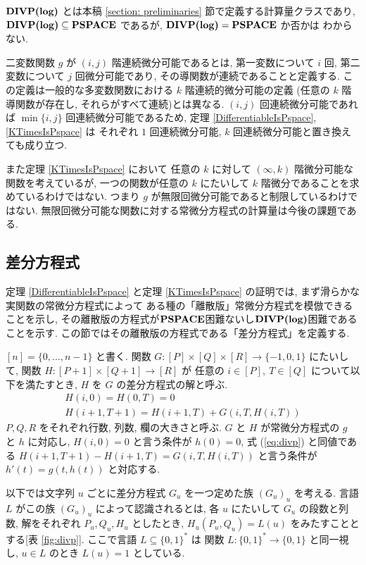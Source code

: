  $\text{\bf DIVP(log)}$ とは本稿 \ref{section: preliminaries} 節で定義する計算量クラスであり,
 $\text{\bf DIVP(log)} \subseteq {\bf PSPACE}$ であるが, $\text{\bf DIVP(log)} = {\bf PSPACE}$ か否かは
 わからない. 

 二変数関数 $g$ が $(i, j)$ 階連続微分可能であるとは,
 第一変数について $i$ 回, 第二変数について $j$ 回微分可能であり,
 その導関数が連続であることと定義する.
 この定義は一般的な多変数関数における $k$ 階連続的微分可能の定義
 (任意の $k$ 階導関数が存在し, それらがすべて連続)とは異なる.
 $(i,j)$ 回連続微分可能であれば $\min \{i, j\}$ 回連続微分可能であるため,
 定理 \ref{DifferentiableIsPspace}, \ref{KTimesIsPspace} は
 それぞれ $1$ 回連続微分可能, $k$ 回連続微分可能と置き換えても成り立つ.

 また定理 \ref{KTimesIsPspace} において
 任意の $k$ に対して $(\infty, k)$ 階微分可能な関数を考えているが,
 一つの関数が任意の $k$ にたいして $k$ 階微分であることを求めているわけではない.
 つまり $g$ が無限回微分可能であると制限しているわけではない. 
 無限回微分可能な関数に対する常微分方程式の計算量は今後の課題である.





\subsection{差分方程式}
\label{section:divp}

定理 \ref{DifferentiableIsPspace} と定理 \ref{KTimesIsPspace} の証明では,
まず滑らかな実関数の常微分方程式によって
ある種の「離散版」常微分方程式を模倣できることを示し, 
その離散版の方程式が${\bf PSPACE}$困難ないし$\text{\bf DIVP(log)}$困難であることを示す.
この節ではその離散版の方程式である「差分方程式」を定義する.

$[n] = \{0, \dots , n-1\}$ と書く.
関数 $G \colon [P] \times [Q] \times [R] \to \{-1, 0, 1\}$ にたいして,
関数 $H \colon [P + 1] \times [Q+1] \to [R]$ が
任意の $i \in [P],\ T \in [Q]$ について以下を満たすとき,
$H$ を $G$ の差分方程式の解と呼ぶ.
\begin{gather}
   H(i, 0) = H(0, T) = 0 
\\
   H(i + 1, T + 1) = H(i+1, T) + G(i, T, H(i, T))  \label{eq:divp}
\end{gather}
$P, Q, R$ をそれぞれ行数, 列数, 欄の大きさと呼ぶ.
$G$ と $H$ が常微分方程式の $g$ と $h$ に対応し,
$H(i, 0) = 0$ と言う条件が $h(0) = 0$,
式 (\ref{eq:divp}) と同値である $H(i + 1, T + 1) - H(i+1, T) = G(i, T, H(i, T))$
と言う条件が $h'(t) = g(t, h(t))$ と対応する.

以下では文字列 $u$ ごとに差分方程式 $G _u$ を一つ定めた族 $(G _u) _u$ を考える. 
 言語 $L$ がこの族 $(G_u)_u$ によって認識されるとは,
 各 $u$ にたいして $G_u$ の段数と列数, 解をそれぞれ $P_u, Q_u, H_u$ としたとき,
 $H_u(P_u, Q_u) = L(u)$ をみたすこととする[表 \ref{fig:divp}].
ここで言語 $L \subseteq \{0, 1\} ^*$ は
関数 $L \colon \{0, 1\} ^* \to \{0, 1\}$ と同一視し, 
$u \in L$ のとき $L (u) = 1$ としている. 

